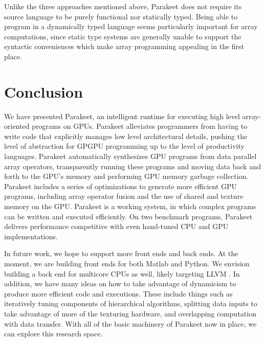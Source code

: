 \documentclass[preprint]{sigplanconf}
\begin{document}
Unlike the three approaches mentioned above, Parakeet does not require its
source language to be purely functional nor statically typed. Being able to
program in a dynamically typed language seems particularly important for array
computations, since static type systems are generally unable to support the
syntactic conveniences which make array programming appealing in the first
place.

\section{Conclusion}
\label{Conclusion}

We have presented Parakeet, an intelligent runtime for executing high level
array-oriented programs on GPUs.  Parakeet alleviates programmers from having
to write code that explicitly manages low level architectural details, pushing
the level of abstraction for GPGPU programming up to the level of productivity
languages.  Parakeet automatically synthesizes GPU programs from data parallel
array operators, transparently running these programs and moving data back and
forth to the GPU's memory and performing GPU memory garbage collection.
Parakeet includes a series of optimizations to generate more efficient GPU
programs, including array operator fusion and the use of shared and texture
memory on the GPU.  Parakeet is a working system, in which complex programs can
be written and executed efficiently.  On two benchmark programs, Parakeet
delivers performance competitive with even hand-tuned CPU and GPU
implementations.

In future work, we hope to support more front ends and back ends.  At the
moment, we are building front ends for both Matlab and Python.  We envision
building a back end for multicore CPUs as well, likely targeting LLVM
\cite{Latt02}.  In addition, we have many ideas on how to take advantage of
dynamicism to produce more efficient code and executions.  These include things
such as iteratively tuning components of hierarchical algorithms, splitting
data inputs to take advantage of more of the texturing hardware, and overlapping
computation with data transfer.  With all of the basic machinery of Parakeet now
in place, we can explore this research space.


{}
\end{document}

